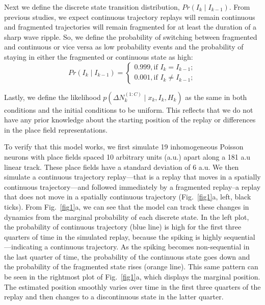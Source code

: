 \documentclass[conference]{IEEEtran}
\begin{document}
Next we define the discrete state transition distribution, $Pr(I_{k} \mid I_{k-1})$. From previous studies, we expect continuous trajectory replays will remain continuous and fragmented trajectories will remain fragmented for at least the duration of a sharp wave ripple. So, we define the probability of switching between fragmented and continuous or vice versa as low probability events and the probability of staying in either the fragmented or continuous state as high:
\begin{equation}
    Pr(I_{k} \mid I_{k-1}) = \begin{cases}
    0.999, \text{if } I_{k} = I_{k-1}; \\
    0.001, \text{if } I_{k} \ne I_{k-1};
    \end{cases}
\end{equation}{}

Lastly, we define the likelihood $p(\Delta N_{k}^{(1:C)} \mid x_{k}, I_{k}, H_{k})$ as the same in both conditions and the initial conditions to be uniform. This reflects that we do not have any prior knowledge about the starting position of the replay or differences in the place field representations.

To verify that this model works, we first simulate 19 inhomogeneous Poisson neurons with place fields spaced 10 arbitrary units (a.u.) apart along a 181 a.u linear track. These place fields have a standard deviation of 6 a.u. We then simulate a continuous trajectory replay---that is a replay that moves in a spatially continuous trajectory---and followed immediately by a fragmented replay--a replay that does not move in a spatially continuous trajectory (Fig.~\ref{fig1}a, left, black ticks). From Fig.~\ref{fig1}a, we can see that the model can track these changes in dynamics from the marginal probability of each discrete state. In the left plot, the probability of continuous trajectory (blue line) is high for the first three quarters of time in the simulated replay, because the spiking is highly sequential---indicating a continuous trajectory. As the spiking becomes non-sequential in the last quarter of time, the probability of the continuous state goes down and the probability of the fragmented state rises (orange line). This same pattern can be seen in the rightmost plot of Fig.~\ref{fig1}a, which displays the marginal position. The estimated position smoothly varies over time in the first three quarters of the replay and then changes to a discontinuous state in the latter quarter.
\end{document}
